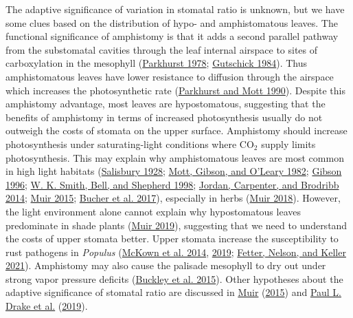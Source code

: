 \documentclass[
  10pt,
]{article}
\begin{document}
The adaptive significance of variation in stomatal ratio is unknown, but we have some clues based on the distribution of hypo- and amphistomatous leaves. The functional significance of amphistomy is that it adds a second parallel pathway from the substomatal cavities through the leaf internal airspace to sites of carboxylation in the mesophyll (\protect\hyperlink{ref-parkhurst_adaptive_1978}{Parkhurst 1978}; \protect\hyperlink{ref-gutschick_photosynthesis_1984}{Gutschick 1984}). Thus amphistomatous leaves have lower resistance to diffusion through the airspace which increases the photosynthetic rate (\protect\hyperlink{ref-parkhurst_intercellular_1990}{Parkhurst and Mott 1990}). Despite this amphistomy advantage, most leaves are hypostomatous, suggesting that the benefits of amphistomy in terms of increased photosynthesis usually do not outweigh the costs of stomata on the upper surface. Amphistomy should increase photosynthesis under saturating-light conditions where CO\(_2\) supply limits photosynthesis. This may explain why amphistomatous leaves are most common in high light habitats (\protect\hyperlink{ref-salisbury_i_1928}{Salisbury 1928}; \protect\hyperlink{ref-mott_adaptive_1982}{Mott, Gibson, and O'Leary 1982}; \protect\hyperlink{ref-gibson_structure-function_1996}{Gibson 1996}; \protect\hyperlink{ref-smith_associations_1998}{W. K. Smith, Bell, and Shepherd 1998}; \protect\hyperlink{ref-jordan_using_2014}{Jordan, Carpenter, and Brodribb 2014}; \protect\hyperlink{ref-muir_making_2015}{Muir 2015}; \protect\hyperlink{ref-bucher_stomatal_2017}{Bucher et al. 2017}), especially in herbs (\protect\hyperlink{ref-muir_light_2018}{Muir 2018}). However, the light environment alone cannot explain why hypostomatous leaves predominate in shade plants (\protect\hyperlink{ref-muir_is_2019}{Muir 2019}), suggesting that we need to understand the costs of upper stomata better. Upper stomata increase the susceptibility to rust pathogens in \emph{Populus} (\protect\hyperlink{ref-mckown_association_2014}{McKown et al. 2014}, \protect\hyperlink{ref-mckown_role_2019}{2019}; \protect\hyperlink{ref-fetter_growthdefense_2021}{Fetter, Nelson, and Keller 2021}). Amphistomy may also cause the palisade mesophyll to dry out under strong vapor pressure deficits (\protect\hyperlink{ref-buckley_how_2015}{Buckley et al. 2015}). Other hypotheses about the adaptive significance of stomatal ratio are discussed in \protect\hyperlink{ref-muir_making_2015}{Muir} (\protect\hyperlink{ref-muir_making_2015}{2015}) and \protect\hyperlink{ref-drake_two_2019}{Paul L. Drake et al.} (\protect\hyperlink{ref-drake_two_2019}{2019}).
\end{document}
